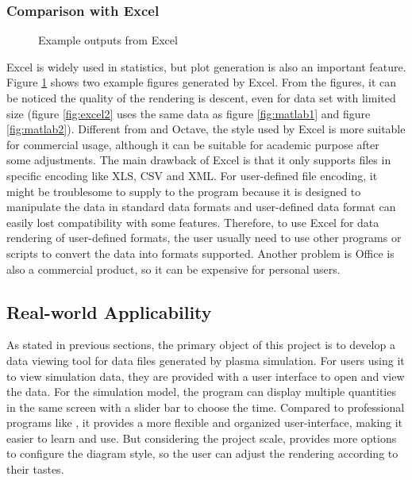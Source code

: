 \subsubsection{Comparison with Excel}

\begin{figure}[tb]
	\centering
	 \hspace{1em}
	\caption{Example outputs from Excel}
	\label{fig:excel}
\end{figure}

Excel is widely used in statistics, but plot generation is also an important feature. Figure \ref{fig:excel} shows two example figures generated by Excel. From the figures, it can be noticed the quality of the rendering is descent, even for data set with limited size (figure \ref{fig:excel2} uses the same data as figure \ref{fig:matlab1} and figure \ref{fig:matlab2}). Different from \MatLab{} and Octave, the style used by Excel is more suitable for commercial usage, although it can be suitable for academic purpose after some adjustments. The main drawback of Excel is that it only supports files in specific encoding like XLS, CSV and XML. For user-defined file encoding, it might be troublesome to supply to the program because it is designed to manipulate the data in standard data formats and user-defined data format can easily lost compatibility with some features. Therefore, to use Excel for data rendering of user-defined formats, the user usually need to use other programs or scripts to convert the data into formats supported. Another problem is Office is also a commercial product, so it can be expensive for personal users.

\subsection{Real-world Applicability}

As stated in previous sections, the primary object of this project is to develop a data viewing tool for data files generated by plasma simulation. For users using it to view simulation data, they are provided with a user interface to open and view the data. For the simulation model, the program can display multiple quantities in the same screen with a slider bar to choose the time. Compared to professional programs like \MatLab{}, it provides a more flexible and organized user-interface, making it easier to learn and use. But considering the project scale, \MatLab{} provides more options to configure the diagram style, so the user can adjust the rendering according to their tastes.

